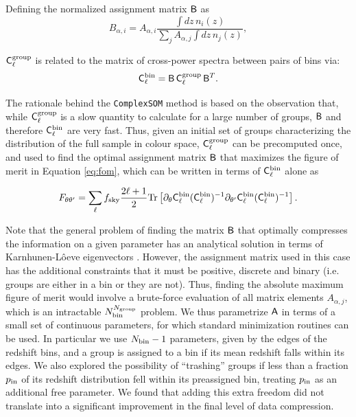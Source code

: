 \documentclass[twocolumn,twocolappendix]{aastex63}
\begin{document}
Defining the normalized assignment matrix ${\sf B}$ as
\begin{equation}
B_{\alpha,i}=A_{\alpha,i}\frac{\int dz\,n_i(z)}{\sum_j A_{\alpha,j}\int dz\,n_j(z)},
\end{equation}

${\sf C}^{\rm group}_\ell$ is related to the matrix of cross-power spectra
between pairs of bins via:
\begin{equation}
{\sf C}^{\rm bin}_\ell={\sf B}\,{\sf C}^{\rm group}_\ell\,{\sf B}^T.
\end{equation}

The rationale behind the {\tt ComplexSOM} method is based on the observation
that, while ${\sf C}^{\rm group}_\ell$ is a slow quantity to calculate for a
large number of groups, ${\sf B}$ and therefore ${\sf C}^{\rm bin}_\ell$ are
very fast. Thus, given an initial set of groups characterizing the
distribution of the full sample in colour space, ${\sf C}^{\rm group}_\ell$
can be precomputed once, and used to find the optimal assignment matrix ${\sf
B}$ that maximizes the figure of merit in Equation \ref{eq:fom},
which can be written in terms of ${\sf C}^{\rm bin}_\ell$ alone as

\begin{equation}\label{eq:fom_tr}
F_{\theta\theta'}=\sum_\ell f_{\rm sky}\frac{2\ell+1}{2}{\rm Tr}\left[\partial_\theta{\sf C}^{\rm bin}_\ell({\sf C}^{\rm bin}_\ell)^{-1}\partial_{\theta'}{\sf C}^{\rm bin}_\ell({\sf C}_\ell^{\rm bin})^{-1}\right].
\end{equation}

Note that the general problem of finding the matrix ${\sf B}$ that optimally
compresses the information on a given parameter has an analytical solution in
terms of Karnhunen-L\^oeve eigenvectors \citep{astro-ph/9603021}. However, the
assignment matrix used in this case has the additional constraints that it
must be positive, discrete and binary (i.e. groups are either in a bin or they
are not). Thus, finding the absolute maximum figure of merit would involve a
brute-force evaluation of all matrix elements $A_{\alpha,j}$, which is an
intractable $N_{\rm bin}^{N_{\rm group}}$ problem. We thus parametrize ${\sf
A}$ in terms of a small set of continuous parameters, for which standard
minimization routines can be used. In particular we use $N_{\rm bin}-1$
parameters, given by the edges of the redshift bins, and a group is assigned
to a bin if its mean redshift falls within its edges. We also explored the
possibility of ``trashing'' groups if less than a fraction $p_{\rm in}$ of its
redshift distribution fell within its preassigned bin, treating $p_{\rm in}$
as an additional free parameter. We found that adding this extra freedom did
not translate into a significant improvement in the final level of data
compression.
\end{document}

